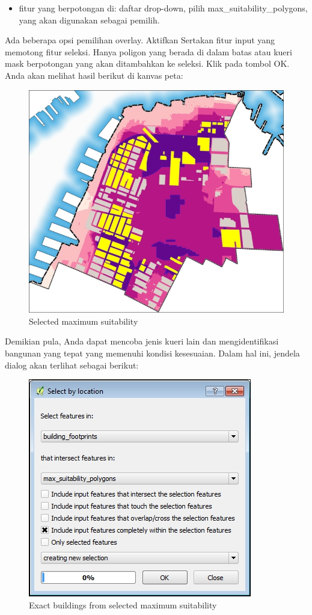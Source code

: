 \documentclass[]{book}
\providecommand{\tightlist}{%
  \setlength{\itemsep}{0pt}\setlength{\parskip}{0pt}}
\begin{document}
\begin{itemize}
\tightlist
\item
  fitur yang berpotongan di: daftar drop-down, pilih max\_suitability\_polygons, yang akan digunakan sebagai pemilih.
\end{itemize}

Ada beberapa opsi pemilihan overlay. Aktifkan Sertakan fitur input yang memotong fitur seleksi. Hanya poligon yang berada di dalam batas atau kueri mask berpotongan yang akan ditambahkan ke seleksi. Klik pada tombol OK. Anda akan melihat hasil berikut di kanvas peta:

\begin{figure}

{\centering \includegraphics[width=0.7\linewidth]{images/04/fig47} 

}

\caption{Selected maximum suitability}\label{fig:fig1447}
\end{figure}

Demikian pula, Anda dapat mencoba jenis kueri lain dan mengidentifikasi bangunan yang tepat yang memenuhi kondisi kesesuaian. Dalam hal ini, jendela dialog akan terlihat sebagai berikut:

\begin{figure}

{\centering \includegraphics[width=0.6\linewidth]{images/04/fig48} 

}

\caption{Exact buildings from selected maximum suitability}\label{fig:fig1448}
\end{figure}
\end{document}
